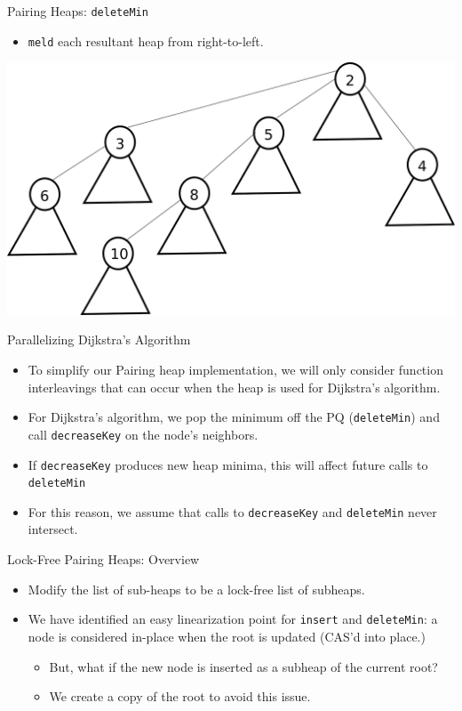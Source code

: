\documentclass{beamer}
\begin{document}
\begin{frame}{Pairing Heaps: \texttt{deleteMin}}
  \begin{itemize}
    \item \texttt{meld} each resultant heap from right-to-left.
  \end{itemize}
  \includegraphics[scale=0.25]{img/deleteMin5.pdf}
\end{frame}

\begin{frame}{Parallelizing Dijkstra's Algorithm}
  \begin{itemize}
  \item To simplify our Pairing heap implementation, we will only
    consider function interleavings that can occur when the heap is used
    for Dijkstra's algorithm.
  \item For Dijkstra's algorithm, we pop the minimum off the PQ (\texttt{deleteMin})
    and call \texttt{decreaseKey} on the node's neighbors.
  \item If \texttt{decreaseKey} produces new heap minima, this will affect
    future calls to \texttt{deleteMin}
  \item For this reason, we assume that calls to \texttt{decreaseKey} and \texttt{deleteMin}
    never intersect.
  \end{itemize}
\end{frame}

\begin{frame}{Lock-Free Pairing Heaps: Overview}
  \begin{itemize}
    \item Modify the list of sub-heaps to be a lock-free list of subheaps.
    \item We have identified an easy linearization point for \texttt{insert} and \texttt{deleteMin}:
      a node is considered in-place when the root is updated (CAS'd into place.)
      \begin{itemize}
        \item But, what if the new node is inserted as a subheap of the current root?
        \item We create a copy of the root to avoid this issue.
      \end{itemize}
    \end{itemize}
\end{frame}
\end{document}
